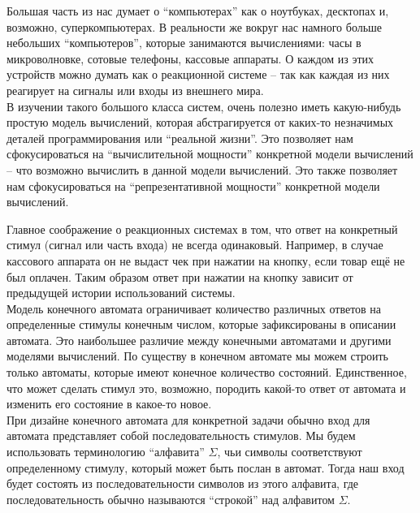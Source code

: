 
\graphicspath{ {imgs/} }






Большая часть из нас думает о ``компьютерах'' как о ноутбуках, десктопах и, возможно, суперкомпьютерах. В реальности же вокруг нас намного больше небольших ``компьютеров'', которые занимаются вычислениями: часы в микроволновке, сотовые телефоны, кассовые аппараты. О каждом из этих устройств можно думать как о реакционной системе -- так как каждая из них реагирует на сигналы или входы из внешнего мира. \\

В изучении такого большого класса систем, очень полезно иметь какую-нибудь простую модель вычислений, которая абстрагируется от каких-то незначимых деталей программирования или ``реальной жизни''. Это позволяет нам сфокусироваться на ``вычислительной мощности'' конкретной модели вычислений -- что возможно вычислить в данной модели вычислений. Это также позволяет нам сфокусироваться на ``репрезентативной мощности'' конкретной модели вычислений.


Главное соображение о реакционных системах в том, что ответ на конкретный стимул (сигнал или часть входа) не всегда одинаковый. Например, в случае кассового аппарата он не выдаст чек при нажатии на кнопку, если товар ещё не был оплачен. Таким образом ответ при нажатии на кнопку зависит от предыдущей истории использований системы. \\

Модель конечного автомата ограничивает количество различных ответов на определенные стимулы конечным числом, которые зафиксированы в описании автомата. Это наибольшее различие между конечными автоматами и другими моделями вычислений. По существу в конечном автомате мы можем строить только автоматы, которые имеют конечное количество состояний. Единственное, что может сделать стимул это, возможно, породить какой-то ответ от автомата и изменить его состояние в какое-то новое. \\

При дизайне конечного автомата для конкретной задачи обычно вход для автомата представляет собой последовательность стимулов. Мы будем использовать терминологию ``алфавита'' $\Sigma$, чьи символы соответствуют определенному стимулу, который может быть послан в автомат. Тогда наш вход будет состоять из последовательности символов из этого алфавита, где последовательность обычно называются ``строкой'' над алфавитом $\Sigma$.

